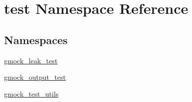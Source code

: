 \hypertarget{namespacetest}{}\section{test Namespace Reference}
\label{namespacetest}
\subsection*{Namespaces}
\begin{DoxyCompactItemize}
\item 
 \mbox{\hyperlink{namespacetest_1_1gmock__leak__test}{gmock\+\_\+leak\+\_\+test}}
\item 
 \mbox{\hyperlink{namespacetest_1_1gmock__output__test}{gmock\+\_\+output\+\_\+test}}
\item 
 \mbox{\hyperlink{namespacetest_1_1gmock__test__utils}{gmock\+\_\+test\+\_\+utils}}
\end{DoxyCompactItemize}
